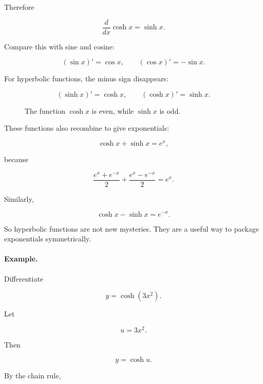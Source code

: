 Therefore

\[
\boxed{
\frac{d}{dx}\cosh x=\sinh x.
}
\]

Compare this with sine and cosine:

\[
(\sin x)'=\cos x,
\qquad
(\cos x)'=-\sin x.
\]

For hyperbolic functions, the minus sign disappears:

\[
(\sinh x)'=\cosh x,
\qquad
(\cosh x)'=\sinh x.
\]

\begin{figure}[h]
\centering
{}
\caption{The function \(\cosh x\) is even, while \(\sinh x\) is odd.}
\label{fig:sinh-cosh-graphs}
\end{figure}

These functions also recombine to give exponentials:

\[
\cosh x+\sinh x=e^x,
\]

because

\[
\frac{e^x+e^{-x}}2+\frac{e^x-e^{-x}}2=e^x.
\]

Similarly,

\[
\cosh x-\sinh x=e^{-x}.
\]

So hyperbolic functions are not new mysteries.  They are a useful way to package exponentials symmetrically.

\paragraph{Example.}
Differentiate

\[
y=\cosh(3x^2).
\]

Let

\[
u=3x^2.
\]

Then

\[
y=\cosh u.
\]

By the chain rule,

